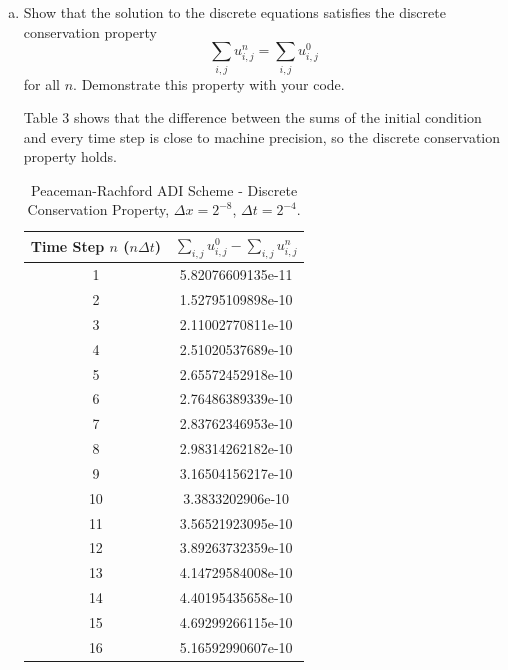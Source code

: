 \documentclass[12pt]{article}
\begin{document}
\begin{enumerate}[(a)]
\item  Show that the solution to the discrete equations satisfies the discrete conservation property
$$\sum_{i,j} u_{i,j}^n = \sum_{i,j} u^0_{i,j} $$
for all $n$. Demonstrate this property with your code.

Table 3 shows that the difference between the sums of the initial condition and every time step is close to machine precision, so the discrete conservation property holds.
\begin{table}[H]
\caption{Peaceman-Rachford ADI Scheme - Discrete Conservation Property, $\Delta x = 2^{-8}$, $\Delta t = 2^{-4}$.}
\centering\begin{tabular}{|cc|}
\hline \hline
Time Step $n$ ($n\Delta t$) & $\sum_{i,j} u_{i,j}^0 - \sum_{i,j} u^n_{i,j}$ \\
\hline  
1 & 5.82076609135e-11 \\
2 & 1.52795109898e-10 \\
3 & 2.11002770811e-10 \\
4 & 2.51020537689e-10 \\
5 & 2.65572452918e-10 \\
6 & 2.76486389339e-10 \\
7 & 2.83762346953e-10 \\
8 & 2.98314262182e-10 \\
9 & 3.16504156217e-10 \\
10 & 3.3833202906e-10 \\
11 & 3.56521923095e-10 \\
12 & 3.89263732359e-10 \\
13 & 4.14729584008e-10 \\
14 & 4.40195435658e-10 \\
15 & 4.69299266115e-10 \\
16 & 5.16592990607e-10 \\
\hline \hline
\end{tabular}
\end{table}


\end{enumerate}
\end{document}
